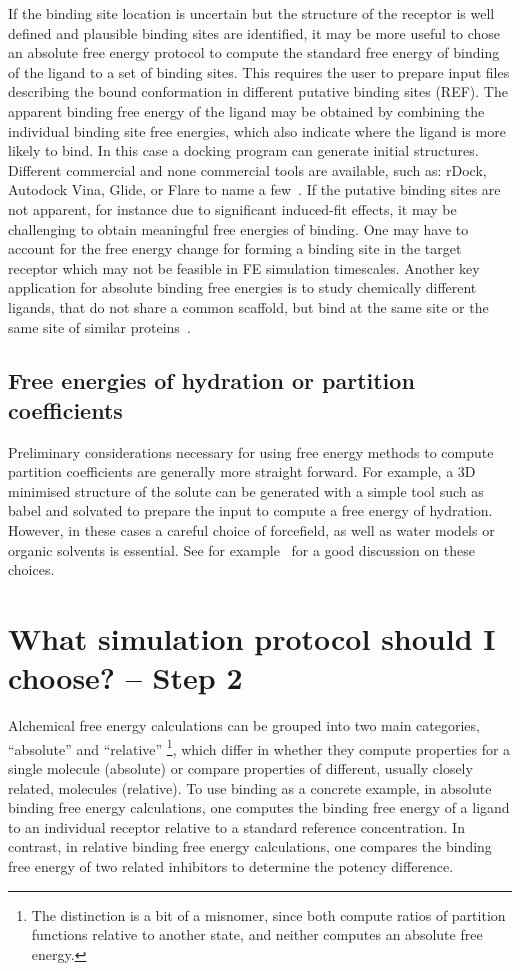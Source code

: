 \documentclass[9pt,bestpractices]{livecoms}
\begin{document}
If the binding site location is uncertain but the structure of the receptor is well defined and plausible binding sites are identified, it may be more useful to chose an absolute free energy protocol to compute the standard free energy of binding of the ligand to a set of binding sites. This requires the user to prepare input files describing the bound conformation in different putative binding sites (REF). The apparent binding free energy of the ligand may be obtained by combining the individual binding site free energies, which also indicate where the ligand is more likely to bind. In this case a docking program can generate initial structures. Different commercial and none commercial tools are available, such as: rDock, Autodock Vina, Glide, or Flare to name a few~\cite{ruiz-carmona2014rdock, trott2010autodock, friesner2004glide, cheeseright2006molecular}. 
If the putative binding sites are not apparent, for instance due to significant induced-fit effects, it may be challenging to obtain meaningful free energies of binding. One may have to account for the free energy change for forming a binding site in the target receptor which may not be feasible in FE simulation timescales. Another key application for absolute binding free energies is to study chemically different ligands, that do not share a common scaffold, but bind at the same site or the same site of similar proteins~\cite{aldeghi2015accurate}.  

\subsection*{Free energies of hydration or partition coefficients}
Preliminary considerations necessary for using free energy methods to compute partition coefficients are generally more straight forward. For example, a 3D minimised structure of the solute can be generated with a simple tool such as babel and solvated to prepare the input  to compute a free energy of hydration. However, in these cases a careful choice of forcefield, as well as water models or organic solvents is essential. See for example~\cite{bosisio2016blinded,rustenburg2016measuring} for a good discussion on these choices. 

%
%
%
%
\section{What simulation protocol should I choose? -- Step 2}
\label{sec:step2}
Alchemical free energy calculations can be grouped into two main categories, ``absolute'' and ``relative'' \footnote{The distinction is a bit of a misnomer, since both compute ratios of partition functions relative to another state, and neither computes an absolute free energy.}, which differ in whether they compute properties for a single molecule (absolute) or compare properties of different, usually closely related, molecules (relative).
To use binding as a concrete example, in absolute binding free energy calculations, one computes the binding free energy of a ligand to an individual receptor relative to a standard reference concentration.
In contrast, in relative binding free energy calculations, one compares the binding free energy of two related inhibitors to determine the potency difference.
\end{document}
